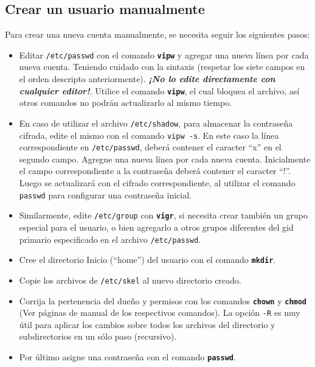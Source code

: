 \documentclass[12pt]{article}
\begin{document}
\subsection{Crear un usuario manualmente}

Para crear una nueva cuenta manualmente, se necesita seguir los siguientes pasos:

\begin{itemize}
	
	\item  Editar \texttt{/etc/passwd} con el comando 
	\texttt{\textbf{vipw}} y agregar una nueva línea por cada nueva cuenta.
	Teniendo cuidado con la sintaxis (respetar los siete campos en el orden 
	descripto anteriormente).  \textit{\bf ¡No lo edite directamente
	con cualquier editor!}. Utilice el comando \texttt{\textbf{vipw}}, el cual bloquea el
	archivo, así otros comandos no podrán actualizarlo al mismo tiempo.

	\item En caso de utilizar el archivo \texttt{/etc/shadow}, para almacenar
	la contraseña cifrada, edite el mismo con el comando \texttt{vipw -s}. En este
	caso la línea correspondiente en \texttt{/etc/passwd}, deberá contener el caracter
	``x'' en el segundo campo. Agregue una nueva línea por cada nueva cuenta. Inicialmente
	el campo correspondiente a la contraseña deberá contener el caracter ``!''. Luego 
	se actualizará con el cifrado correspondiente, al utilizar el comando \texttt{passwd} para 
	configurar una contraseña inicial.  

	\item Similarmente, edite \texttt{/etc/group} con
	\texttt{\textbf{vigr}}, si necesita crear también un
	grupo especial para el usuario, o bien agregarlo a otros grupos
	diferentes del gid primario especificado en el archivo \texttt{/etc/passwd}.  
        
	\item Cree el directorio Inicio (``home'') del
	usuario con el comando \texttt{\textbf{mkdir}}.

	\item Copie los archivos de \texttt{/etc/skel} al nuevo directorio creado.

	\item Corrija
	la pertenencia del dueño y permisos con los comandos
	\texttt{\textbf{chown}} y \texttt{\textbf{chmod}} (Ver páginas de
	manual de los respectivos comandos). La opción \texttt{-R} es
	muy útil para aplicar los cambios sobre todos los archivos del directorio
	y subdirectorios en un sólo paso (recursivo). 
 
	\item Por último asigne una contraseña con el comando
	\texttt{\textbf{passwd}}.

\end{itemize} 
\end{document}
